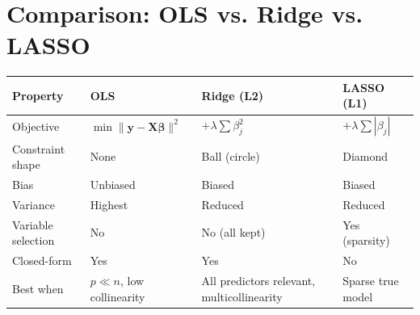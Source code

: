 \documentclass{article}
\begin{document}
\newpage
\section{Comparison: OLS vs. Ridge vs. LASSO}

\begin{table}[h]
\centering
\small
\begin{tabularx}{\textwidth}{>{\raggedright\arraybackslash}p{}
                            >{\raggedright\arraybackslash}p{}
                            >{\raggedright\arraybackslash}p{}
                            >{\raggedright\arraybackslash}X}
\toprule
\textbf{Property} & \textbf{OLS} & \textbf{Ridge (L2)} & \textbf{LASSO (L1)} \\
\midrule
Objective & $\min \|\mathbf{y} - \mathbf{X}\boldsymbol{\beta}\|^2$ & $+ \lambda \sum \beta_j^2$ & $+ \lambda \sum |\beta_j|$ \\
Constraint shape & None & Ball (circle) & Diamond \\
Bias & Unbiased & Biased & Biased \\
Variance & Highest & Reduced & Reduced \\
Variable selection & No & No (all kept) & Yes (sparsity) \\
Closed-form & Yes & Yes & No \\
Best when & $p \ll n$, low collinearity & All predictors relevant, multicollinearity & Sparse true model \\
\bottomrule
\end{tabularx}
\end{table}
\end{document}
